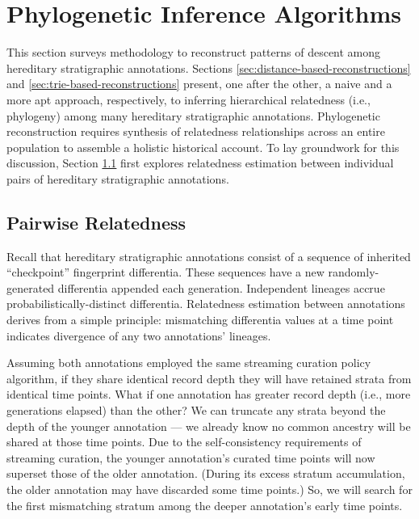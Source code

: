 \section{Phylogenetic Inference Algorithms} \label{sec:reconstruction}

This section surveys methodology to reconstruct patterns of descent among hereditary stratigraphic annotations.  %
Sections \ref{sec:distance-based-reconstructions} and \ref{sec:trie-based-reconstructions} present, one after the other, a naive and a more apt approach, respectively, to inferring hierarchical relatedness (i.e., phylogeny) among many hereditary stratigraphic annotations.
Phylogenetic reconstruction requires synthesis of relatedness relationships across an entire population to assemble a holistic historical account.  %
To lay groundwork for this discussion, Section \ref{sec:pairwise-relatedness} first explores relatedness estimation between individual pairs of hereditary stratigraphic annotations.

\subsection{Pairwise Relatedness}
\label{sec:pairwise-relatedness}

Recall that hereditary stratigraphic annotations consist of a sequence of inherited ``checkpoint'' fingerprint differentia.
These sequences have a new randomly-generated differentia appended each generation.
Independent lineages accrue probabilistically-distinct differentia.
Relatedness estimation between annotations derives from a simple principle: mismatching differentia values at a time point indicates divergence of any two annotations' lineages.

Assuming both annotations employed the same streaming curation policy algorithm, if they share identical record depth they will have retained strata from identical time points.
What if one annotation has greater record depth (i.e., more generations elapsed) than the other?
We can truncate any strata beyond the depth of the younger annotation --- we already know no common ancestry will be shared at those time points.
Due to the self-consistency requirements of streaming curation, the younger annotation's curated time points will now superset those of the older annotation.
(During its excess stratum accumulation, the older annotation may have discarded some time points.)
So, we will search for the first mismatching stratum among the deeper annotation's early time points.

